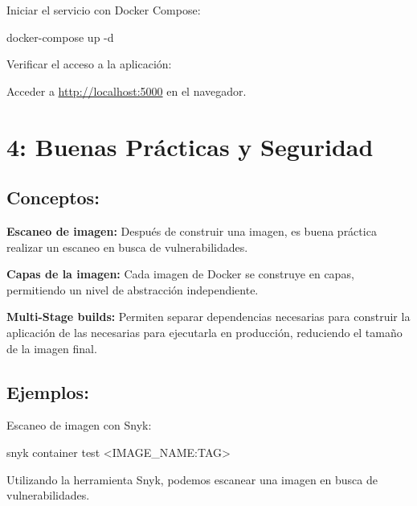 \documentclass[
  a4paper,
  DIV=11,
  numbers=noendperiod,
  onepage,
  openany]{scrreprt}
\newenvironment{Shaded}{\begin{snugshade}}{\end{snugshade}}
\newcommand{\AttributeTok}[1]{\textcolor[rgb]{0.40,0.45,0.13}{#1}}
\newcommand{\ExtensionTok}[1]{\textcolor[rgb]{0.00,0.23,0.31}{#1}}
\newcommand{\NormalTok}[1]{\textcolor[rgb]{0.00,0.23,0.31}{#1}}
\newcommand{\OperatorTok}[1]{\textcolor[rgb]{0.37,0.37,0.37}{#1}}
\begin{document}
Iniciar el servicio con Docker Compose:

\begin{Shaded}
\begin{Highlighting}[]
\ExtensionTok{docker{-}compose}\NormalTok{ up }\AttributeTok{{-}d}
\end{Highlighting}
\end{Shaded}

Verificar el acceso a la aplicación:

Acceder a \url{http://localhost:5000} en el navegador.

\hypertarget{buenas-pruxe1cticas-y-seguridad}{%
\chapter{4: Buenas Prácticas y
Seguridad}\label{buenas-pruxe1cticas-y-seguridad}}

\hypertarget{conceptos-3}{%
\section{Conceptos:}\label{conceptos-3}}

\textbf{Escaneo de imagen:} Después de construir una imagen, es buena
práctica realizar un escaneo en busca de vulnerabilidades.

\textbf{Capas de la imagen:} Cada imagen de Docker se construye en
capas, permitiendo un nivel de abstracción independiente.

\textbf{Multi-Stage builds:} Permiten separar dependencias necesarias
para construir la aplicación de las necesarias para ejecutarla en
producción, reduciendo el tamaño de la imagen final.

\hypertarget{ejemplos-3}{%
\section{Ejemplos:}\label{ejemplos-3}}

Escaneo de imagen con Snyk:

\begin{Shaded}
\begin{Highlighting}[]
\ExtensionTok{snyk}\NormalTok{ container test }\OperatorTok{\textless{}}\NormalTok{IMAGE\_NAME:TAG}\OperatorTok{\textgreater{}}
\end{Highlighting}
\end{Shaded}

Utilizando la herramienta Snyk, podemos escanear una imagen en busca de
vulnerabilidades.
\end{document}
